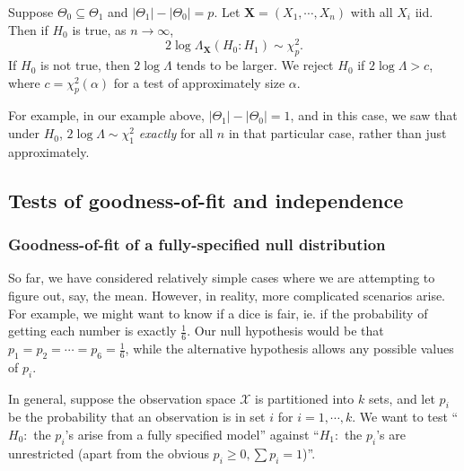 \documentclass[a4paper]{article}
\begin{document}
\begin{thm}
  Suppose $\Theta_0 \subseteq \Theta_1$ and $|\Theta_1| - |\Theta_0| = p$. Let $\mathbf{X} = (X_1, \cdots, X_n)$ with all $X_i$ iid. Then if $H_0$ is true, as $n\to \infty$,
  \[
    2\log \Lambda_\mathbf{X}(H_0:H_1)\sim \chi_p^2.
  \]
  If $H_0$ is not true, then $2\log \Lambda$ tends to be larger. We reject $H_0$ if $2\log \Lambda > c$, where $c = \chi_p^2(\alpha)$ for a test of approximately size $\alpha$.
\end{thm}

For example, in our example above, $|\Theta_1| - |\Theta_0| = 1$, and in this case, we saw that under $H_0$, $2\log \Lambda \sim \chi_1^2$ \emph{exactly} for all $n$ in that particular case, rather than just approximately.

\subsection{Tests of goodness-of-fit and independence}
\subsubsection{Goodness-of-fit of a fully-specified null distribution}
So far, we have considered relatively simple cases where we are attempting to figure out, say, the mean. However, in reality, more complicated scenarios arise. For example, we might want to know if a dice is fair, ie. if the probability of getting each number is exactly $\frac{1}{6}$. Our null hypothesis would be that $p_1 = p_2 = \cdots = p_6 = \frac{1}{6}$, while the alternative hypothesis allows any possible values of $p_i$.

In general, suppose the observation space $\mathcal{X}$ is partitioned into $k$ sets, and let $p_i$ be the probability that an observation is in set $i$ for $i = 1, \cdots, k$. We want to test ``$H_0:$ the $p_i$'s arise from a fully specified model'' against ``$H_1:$ the $p_i$'s are unrestricted (apart from the obvious $p_i \geq 0, \sum p_i = 1$)''.
\end{document}
